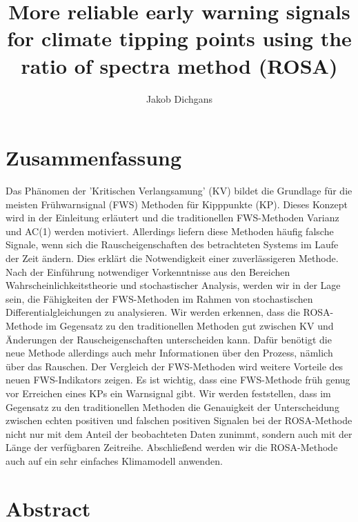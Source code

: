 \documentclass[%
thesis=student,%
coverpage=false,%
titlepage=false,%
headmarks=true, %
english,%
font=libertine, %
math=newpxtx, %
BCOR=5mm,%
coverBCOR=11mm%
]{tumbook}
\title{More reliable early warning signals for climate tipping points using the ratio of spectra method (ROSA)}
\author{Jakob Dichgans}
\begin{document}
\frontmatter
\maketitle

\section*{Zusammenfassung}


Das Phänomen der 'Kritischen Verlangsamung' (KV) bildet die Grundlage für die meisten Frühwarnsignal (FWS) Methoden für Kipppunkte (KP). Dieses Konzept wird in der Einleitung erläutert und die traditionellen FWS-Methoden Varianz und AC(1) werden motiviert. Allerdings liefern diese Methoden häufig falsche Signale, wenn sich die Rauscheigenschaften des betrachteten Systems im Laufe der Zeit ändern. Dies erklärt die Notwendigkeit einer zuverlässigeren Methode. Nach der Einführung 
notwendiger Vorkenntnisse aus den Bereichen Wahrscheinlichkeitstheorie und stochastischer Analysis, werden wir in der Lage sein, die Fähigkeiten der FWS-Methoden im Rahmen von stochastischen Differentialgleichungen zu analysieren. Wir werden erkennen, dass die ROSA-Methode im Gegensatz zu den traditionellen Methoden gut zwischen KV und Änderungen der Rauscheigenschaften unterscheiden kann. Dafür benötigt die neue Methode allerdings auch mehr Informationen über den Prozess, nämlich über das Rauschen. Der Vergleich der FWS-Methoden wird weitere Vorteile des neuen FWS-Indikators zeigen. Es ist wichtig, dass eine FWS-Methode früh genug vor Erreichen eines KPs ein Warnsignal gibt. Wir werden feststellen, dass im Gegensatz zu den traditionellen Methoden die Genauigkeit der Unterscheidung zwischen echten positiven und falschen positiven Signalen bei der ROSA-Methode nicht nur mit dem Anteil der beobachteten Daten zunimmt, sondern auch mit der Länge der verfügbaren Zeitreihe. Abschließend werden wir die ROSA-Methode auch auf ein sehr einfaches Klimamodell anwenden.





\section*{Abstract}
\end{document}
